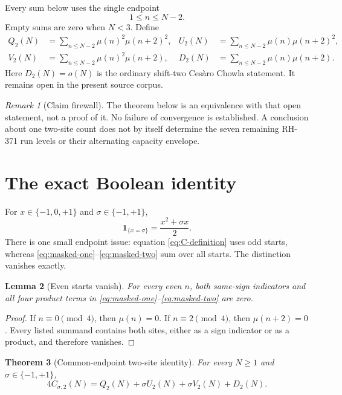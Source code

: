 \documentclass[11pt]{article}
\newtheorem{theorem}{Theorem}[section]
\newtheorem{lemma}[theorem]{Lemma}
\theoremstyle{definition}
\theoremstyle{remark}
\newtheorem{remark}[theorem]{Remark}
\newcommand{\Mob}{\mu}
\newcommand{\one}{\mathbf 1}
\begin{document}
Every sum below uses the single endpoint
\begin{equation}
                         1\le n\le N-2.
 \label{eq:common-endpoint}
\end{equation}
Empty sums are zero when $N<3$.  Define
\begin{align}
 Q_2(N)&=\sum_{n\le N-2}\Mob(n)^2\Mob(n+2)^2,
 &U_2(N)&=\sum_{n\le N-2}\Mob(n)\Mob(n+2)^2,
 \label{eq:masked-one}\\
 V_2(N)&=\sum_{n\le N-2}\Mob(n)^2\Mob(n+2),
 &D_2(N)&=\sum_{n\le N-2}\Mob(n)\Mob(n+2).
 \label{eq:masked-two}
\end{align}
Here $D_2(N)=o(N)$ is the ordinary shift-two Ces\`aro Chowla statement.
It remains open in the present source corpus.

\begin{remark}[Claim firewall]
The theorem below is an equivalence with that open statement, not a proof of
it.  No failure of convergence is established.  A conclusion about one
two-site count does not by itself determine the seven remaining RH-371 run
levels or their alternating capacity envelope.
\end{remark}

\section{The exact Boolean identity}

For $x\in\{-1,0,+1\}$ and $\sigma\in\{-1,+1\}$,
\begin{equation}
              \one_{\{x=\sigma\}}=\frac{x^2+\sigma x}{2}.
 \label{eq:boolean}
\end{equation}
There is one small endpoint issue: equation \eqref{eq:C-definition} uses odd
starts, whereas \eqref{eq:masked-one}--\eqref{eq:masked-two} sum over all
starts.  The distinction vanishes exactly.

\begin{lemma}[Even starts vanish]
For every even $n$, both same-sign indicators and all four product terms in
\eqref{eq:masked-one}--\eqref{eq:masked-two} are zero.
\end{lemma}

\begin{proof}
If $n\equiv0\pmod4$, then $\Mob(n)=0$.  If
$n\equiv2\pmod4$, then $\Mob(n+2)=0$.  Every listed summand contains both
sites, either as a sign indicator or as a product, and therefore vanishes.
\end{proof}

\begin{theorem}[Common-endpoint two-site identity]
For every $N\ge1$ and $\sigma\in\{-1,+1\}$,
\begin{equation}
 \boxed{\displaystyle
 4C_{\sigma,2}(N)
 =Q_2(N)+\sigma U_2(N)+\sigma V_2(N)+D_2(N).}
 \label{eq:master-identity}
\end{equation}
\end{theorem}
\end{document}
